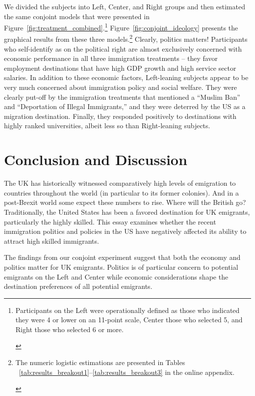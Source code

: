 \documentclass[12pt]{article}
\newcommand{\note}[1]{\footnote{\begin{doublespace}#1\end{doublespace}}}
\begin{document}
\par We divided the subjects into Left, Center, and Right groups and then estimated the same conjoint models that were presented in Figure~\ref{fig:treatment_combined}.\note{Participants on the Left were operationally defined as those who indicated they were 4 or lower on an 11-point scale, Center those who selected 5, and Right those who selected 6 or more.}  Figure~\ref{fig:conjoint_ideology} presents the graphical results from these three models.\note{The numeric logistic estimations are presented in Tables ~\ref{tab:results_breakout1}--\ref{tab:results_breakout3} in the online appendix.}  Clearly, politics matters!  Participants who self-identify as on the political right are almost exclusively concerned with economic performance in all three immigration treatments -- they favor employment destinations that have high GDP growth and high service sector salaries. In addition to these economic factors, Left-leaning subjects appear to be very much concerned about immigration policy and social welfare. They were clearly put-off by the immigration treatments that mentioned a ``Muslim Ban'' and ``Deportation of Illegal Immigrants,'' and they were deterred by the US as a migration destination. Finally, they responded positively to destinations with highly ranked universities, albeit less so than Right-leaning subjects.



\section*{Conclusion and Discussion}

\par The UK has historically witnessed comparatively high levels of emigration to countries throughout the world (in particular to its former colonies).  And in a post-Brexit world some expect these numbers to rise.  Where will the British go?  Traditionally, the United States has been a favored destination for UK emigrants, particularly the highly skilled.  This essay examines whether the recent immigration politics and policies in the US have negatively affected its ability to attract high skilled immigrants. 

\par The findings from our conjoint experiment suggest that both the economy and politics matter for UK emigrants. Politics is of particular concern to potential emigrants on the Left and Center while economic considerations shape the destination preferences of all potential emigrants. 
\end{document}
